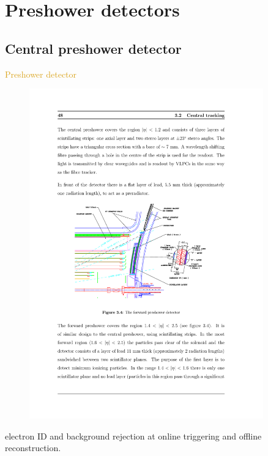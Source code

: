 

\section{Preshower detectors}

\subsection{Central preshower detector}
\begin{frame}{\textcolor{Goldenrod}{Preshower detector }}
  \begin{overlayarea}{\textwidth}{\textheight}
    \begin{figure}[h]\centering
      \includegraphics[height=0.55\textheight, width=0.9\textwidth]{./Images/29_PS_forward.pdf}
    \end{figure} 
    \itt
  \item {}
    \alert{electron ID and background rejection at online triggering and
      offline reconstruction.}
    \tti
  \end{overlayarea}
\end{frame}


